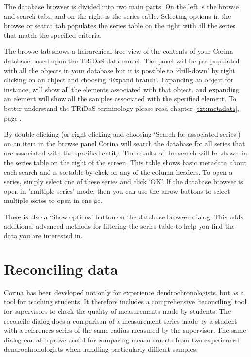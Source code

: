 The database browser is divided into two main parts.  On the left is the browse and search tabs, and on the right is the series table.  Selecting options in the browse or search tab populates the series table on the right with all the series that match the specified criteria.  


The browse tab shows a heirarchical tree view of the contents of your Corina database based upon the TRiDaS data model.  The panel will be pre-populated with all the objects in your database but it is possible to `drill-down' by right clicking on an object and choosing `Expand branch'.  Expanding an object for instance, will show all the elements associated with that object, and expanding an element will show all the samples associated with the specified element.  To better understand the TRiDaS terminology please read chapter \ref{txt:metadata}, page \pageref{txt:metadata}.

By double clicking (or right clicking and choosing `Search for associated series') on an item in the browse panel Corina will search the database for all series that are associated with the specified entity.  The results of the search will be shown in the series table on the right of the screen.  This table shows basic metadata about each search and is sortable by click on any of the column headers.  To open a series, simply select one of these series and click `OK'.  If the database browser is open in 'multiple series' mode, then you can use the arrow buttons to select multiple series to open in one go.

There is also a `Show options' button on the database browser dialog.  This adds additional advanced methods for filtering the series table to help you find the data you are interested in.

\section{Reconciling data}
Corina has been developed not only for experience dendrochronologists, but as a tool for teaching students.  It therefore includes a comprehensive `reconciling' tool for supervisors to check the quality of measurements made by students.  The reconcile dialog does a comparison of a measurement series made by a student with a references series of the same radius measured by the supervisor.  The same dialog can also prove useful for comparing measurements from two experienced dendrochronologists when handling particularly difficult samples.

 


